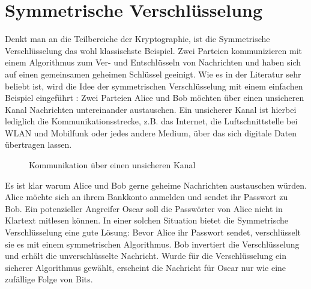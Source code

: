 \section{Symmetrische Verschlüsselung}
Denkt man an die Teilbereiche der Kryptographie, ist die Symmetrische Verschlüsselung
das wohl klassischste Beispiel. Zwei Parteien kommunizieren mit einem
Algorithmus zum Ver- und Entschlüsseln von Nachrichten und haben sich auf einen
gemeinsamen geheimen Schlüssel geeinigt. Wie es in der Literatur sehr beliebt ist,
wird die Idee der symmetrischen Verschlüsselung
mit einem einfachen Beispiel eingeführt \parencite[4-6]{BOOK:crypto}:
Zwei Parteien Alice und Bob möchten über einen unsicheren Kanal Nachrichten untereinander austauschen.
Ein unsicherer Kanal ist hierbei lediglich die Kommunikationsstrecke,
z.B. das Internet, die Luftschnittstelle bei WLAN und Mobilfunk
oder jedes andere Medium, über das sich digitale Daten übertragen lassen.

\begin{figure}[h]
  \centering


  \caption{Kommunikation über einen unsicheren Kanal}
\end{figure}

\noindent
Es ist klar warum Alice und Bob gerne geheime Nachrichten austauschen würden. Alice möchte sich an ihrem
Bankkonto anmelden und sendet ihr Passwort zu Bob. Ein potenzieller Angreifer Oscar
soll die Passwörter von Alice nicht in Klartext mitlesen können.
In einer solchen Situation bietet die Symmetrische Verschlüsselung eine gute Lösung:
Bevor Alice ihr Passwort sendet, verschlüsselt sie es mit einem symmetrischen Algorithmus.
Bob invertiert die Verschlüsselung und erhält die unverschlüsselte Nachricht. Wurde für
die Verschlüsselung ein sicherer Algorithmus gewählt, erscheint die Nachricht für Oscar nur wie
eine zufällige Folge von Bits.
\newpage

